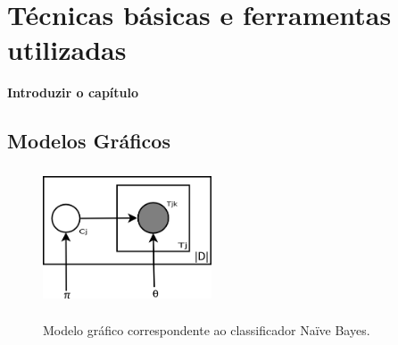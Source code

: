 \chapter{Técnicas básicas e ferramentas utilizadas}

\textbf{Introduzir o capítulo}



\section{Modelos Gráficos}

\begin{figure}[t]
  \centering %
  \includegraphics[width=5cm, height=4cm]{graphical-naive.png}\\
  \caption{Modelo gráfico correspondente ao classificador Naïve Bayes.}
  \label{fig:graphical-naive}
\end{figure}

